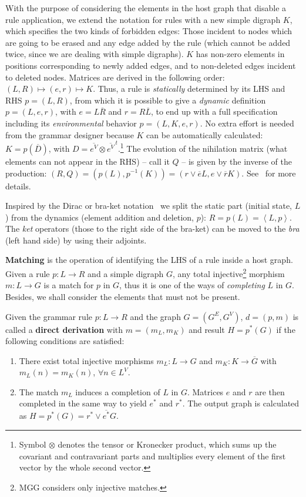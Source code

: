 \documentclass{fundam}
\begin{document}
With the purpose of considering the elements in the host graph that
disable a rule application, we extend the notation for rules with a
new simple digraph $K$, which specifies the two kinds of forbidden
edges: Those incident to nodes which are going to be erased and any
edge added by the rule (which cannot be added twice, since we are
dealing with simple digraphs). $K$ has non-zero elements in positions
corresponding to newly added edges, and to non-deleted edges incident
to deleted nodes. Matrices are derived in the following order: $\left(
  L, R \right) \mapsto \left( e, r \right) \mapsto K$.  Thus, a rule
is \emph{statically} determined by its LHS and RHS $p = \left( L, R
\right)$, from which it is possible to give a \emph{dynamic}
definition $p = \left(L, e, r \right)$, with $e = L\overline{R}$ and
$r = R\overline{L}$, to end up with a full specification including its
\emph{environmental} behavior $p = \left(L, K, e, r \right)$.  No
extra effort is needed from the grammar designer because $K$ can be
automatically calculated: $K = p ( \overline{D} )$, with $D =
\overline{e^V} \otimes \overline{e^V}^{\,t}$.\footnote{Symbol
  $\otimes$ denotes the tensor or Kronecker product, which sums up the
  covariant and contravariant parts and multiplies every element of
  the first vector by the whole second vector.} The evolution of the
nihilation matrix (what elements can not appear in the RHS) -- call it
$Q$ -- is given by the inverse of the production: $(R,Q) = \left(
  p(L), p^{-1}(K) \right) = \left( r \vee \overline{e} L, e \vee
  \overline{r} K \right)$. See~\cite{MGGfundamenta} for more details.

Inspired by the Dirac or bra-ket notation~\cite{braket} we split the
static part (initial state, $L$) from the dynamics (element addition
and deletion, $p$): $R = p(L) = \left \langle L, p \right
\rangle$. The \emph{ket} operators (those to the right side of the
bra-ket) can be moved to the \emph{bra} (left hand side) by using
their adjoints.

\textbf{Matching} is the operation of identifying the LHS of a rule
inside a host graph. Given a rule $p:L \rightarrow R$ and a simple
digraph $G$, any total injective\footnote{MGG considers only injective
  matches.} morphism $m:L \rightarrow G$ is a match for $p$ in $G$,
thus it is one of the ways of {\em completing} $L$ in $G$. Besides, we
shall consider the elements that must not be present.

Given the grammar rule $p:L \rightarrow R$ and the graph $G = (G^E,
G^V)$, $d = \left( p, m \right)$ is called a \textbf{direct
  derivation} with $m = \left( m_L, m_K \right)$ and result $H = p^*
\left( G \right)$ if the following conditions are satisfied:
\begin{enumerate}
\item There exist total injective morphisms $m_L : L \rightarrow G$
  and $m_K : K \rightarrow \overline{G}$ with $m_L(n) = m_K(n)$,
  $\forall n \in L^V$.
\item The match $m_L$ induces a completion of $L$ in $G$. Matrices
  $e$ and $r$ are then completed in the same way to yield $e^*$ and
  $r^*$. The output graph is calculated as $H = p^*(G) = r^* \vee
  \overline {e^*} G$.
\end{enumerate}
\end{document}
